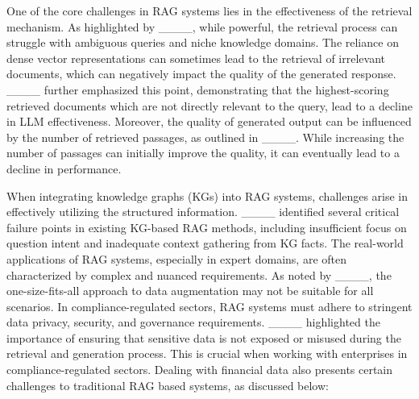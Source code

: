 One of the core challenges in RAG systems lies in the effectiveness of the retrieval mechanism. As highlighted by ____, while powerful, the retrieval process can struggle with ambiguous queries and niche knowledge domains. The reliance on dense vector representations can sometimes lead to the retrieval of irrelevant documents, which can negatively impact the quality of the generated response. ____ further emphasized this point, demonstrating that the highest-scoring retrieved documents which are not directly relevant to the query, lead to a decline in LLM effectiveness. Moreover, the quality of generated output can be influenced by the number of retrieved passages, as outlined in ____. While increasing the number of passages can initially improve the quality, it can eventually lead to a decline in performance.

When integrating knowledge graphs (KGs) into RAG systems, challenges arise in effectively utilizing the structured information. 
____ identified several critical failure points in existing KG-based RAG methods, including insufficient focus on question intent and inadequate context gathering from KG facts. The real-world applications of RAG systems, especially in expert domains, are often characterized by complex and nuanced requirements. As noted by ____, the one-size-fits-all approach to data augmentation may not be suitable for all scenarios. In compliance-regulated sectors, RAG systems must adhere to stringent data privacy, security, and governance requirements. 
____ highlighted the importance of ensuring that sensitive data is not exposed or misused during the retrieval and generation process. This is crucial when working with enterprises in compliance-regulated sectors. Dealing with financial data also presents certain challenges to traditional RAG based systems, as discussed below:
